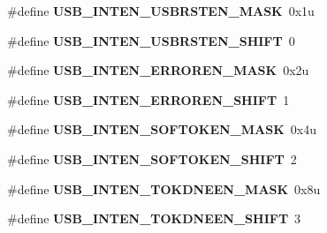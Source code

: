 \begin{DoxyCompactItemize}
\item 
\#define {\bfseries U\+S\+B\+\_\+\+I\+N\+T\+E\+N\+\_\+\+U\+S\+B\+R\+S\+T\+E\+N\+\_\+\+M\+A\+SK}~0x1u\hypertarget{group__USB__Register__Masks_ga67ed1b19b1fe4e25fc5ccf7bf0d42c38}{}\label{group__USB__Register__Masks_ga67ed1b19b1fe4e25fc5ccf7bf0d42c38}

\item 
\#define {\bfseries U\+S\+B\+\_\+\+I\+N\+T\+E\+N\+\_\+\+U\+S\+B\+R\+S\+T\+E\+N\+\_\+\+S\+H\+I\+FT}~0\hypertarget{group__USB__Register__Masks_gaf3b53207fe24da42d123d8e94494b72f}{}\label{group__USB__Register__Masks_gaf3b53207fe24da42d123d8e94494b72f}

\item 
\#define {\bfseries U\+S\+B\+\_\+\+I\+N\+T\+E\+N\+\_\+\+E\+R\+R\+O\+R\+E\+N\+\_\+\+M\+A\+SK}~0x2u\hypertarget{group__USB__Register__Masks_gaf660b76755baff6ed122be3eba21723b}{}\label{group__USB__Register__Masks_gaf660b76755baff6ed122be3eba21723b}

\item 
\#define {\bfseries U\+S\+B\+\_\+\+I\+N\+T\+E\+N\+\_\+\+E\+R\+R\+O\+R\+E\+N\+\_\+\+S\+H\+I\+FT}~1\hypertarget{group__USB__Register__Masks_ga38c74121b3660065935c4f639f987b3c}{}\label{group__USB__Register__Masks_ga38c74121b3660065935c4f639f987b3c}

\item 
\#define {\bfseries U\+S\+B\+\_\+\+I\+N\+T\+E\+N\+\_\+\+S\+O\+F\+T\+O\+K\+E\+N\+\_\+\+M\+A\+SK}~0x4u\hypertarget{group__USB__Register__Masks_ga6398aff7e3278bea66900a35b616563f}{}\label{group__USB__Register__Masks_ga6398aff7e3278bea66900a35b616563f}

\item 
\#define {\bfseries U\+S\+B\+\_\+\+I\+N\+T\+E\+N\+\_\+\+S\+O\+F\+T\+O\+K\+E\+N\+\_\+\+S\+H\+I\+FT}~2\hypertarget{group__USB__Register__Masks_ga8d9738dcc6d852ffd09dbac5e8058431}{}\label{group__USB__Register__Masks_ga8d9738dcc6d852ffd09dbac5e8058431}

\item 
\#define {\bfseries U\+S\+B\+\_\+\+I\+N\+T\+E\+N\+\_\+\+T\+O\+K\+D\+N\+E\+E\+N\+\_\+\+M\+A\+SK}~0x8u\hypertarget{group__USB__Register__Masks_ga59b367a1e2496ad06deee9d86001aa7d}{}\label{group__USB__Register__Masks_ga59b367a1e2496ad06deee9d86001aa7d}

\item 
\#define {\bfseries U\+S\+B\+\_\+\+I\+N\+T\+E\+N\+\_\+\+T\+O\+K\+D\+N\+E\+E\+N\+\_\+\+S\+H\+I\+FT}~3\hypertarget{group__USB__Register__Masks_ga2e0c8229886bcca7e35bee00cd90d236}{}\label{group__USB__Register__Masks_ga2e0c8229886bcca7e35bee00cd90d236}


\end{DoxyCompactItemize}
